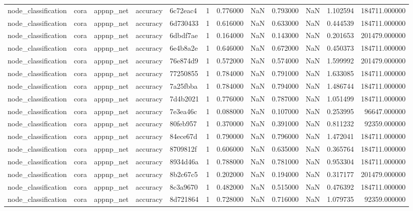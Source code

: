 \begin{tabular}{lllllrrrrrrr}
node_classification & cora & appnp_net & accuracy & 6c72eac4 & 1 & 0.776000 & NaN & 0.793000 & NaN & 1.102594 & 184711.000000 \\
node_classification & cora & appnp_net & accuracy & 6d730433 & 1 & 0.616000 & NaN & 0.633000 & NaN & 0.444539 & 184711.000000 \\
node_classification & cora & appnp_net & accuracy & 6dbdf7ae & 1 & 0.164000 & NaN & 0.143000 & NaN & 0.201653 & 201479.000000 \\
node_classification & cora & appnp_net & accuracy & 6e4b8a2e & 1 & 0.646000 & NaN & 0.672000 & NaN & 0.450373 & 184711.000000 \\
node_classification & cora & appnp_net & accuracy & 76e874d9 & 1 & 0.572000 & NaN & 0.574000 & NaN & 1.599992 & 201479.000000 \\
node_classification & cora & appnp_net & accuracy & 77250855 & 1 & 0.784000 & NaN & 0.791000 & NaN & 1.633085 & 184711.000000 \\
node_classification & cora & appnp_net & accuracy & 7a25fbba & 1 & 0.784000 & NaN & 0.794000 & NaN & 1.486744 & 184711.000000 \\
node_classification & cora & appnp_net & accuracy & 7d4b2021 & 1 & 0.776000 & NaN & 0.787000 & NaN & 1.051499 & 184711.000000 \\
node_classification & cora & appnp_net & accuracy & 7e3ea46c & 1 & 0.088000 & NaN & 0.107000 & NaN & 0.253995 & 96647.000000 \\
node_classification & cora & appnp_net & accuracy & 80feb957 & 1 & 0.370000 & NaN & 0.391000 & NaN & 0.811232 & 92359.000000 \\
node_classification & cora & appnp_net & accuracy & 84ece67d & 1 & 0.790000 & NaN & 0.796000 & NaN & 1.472041 & 184711.000000 \\
node_classification & cora & appnp_net & accuracy & 8709812f & 1 & 0.606000 & NaN & 0.635000 & NaN & 0.365764 & 184711.000000 \\
node_classification & cora & appnp_net & accuracy & 8934d46a & 1 & 0.788000 & NaN & 0.781000 & NaN & 0.953304 & 184711.000000 \\
node_classification & cora & appnp_net & accuracy & 8b2c67c5 & 1 & 0.202000 & NaN & 0.194000 & NaN & 0.317177 & 201479.000000 \\
node_classification & cora & appnp_net & accuracy & 8c3a9670 & 1 & 0.482000 & NaN & 0.515000 & NaN & 0.476392 & 184711.000000 \\
node_classification & cora & appnp_net & accuracy & 8d721864 & 1 & 0.728000 & NaN & 0.716000 & NaN & 1.079735 & 92359.000000 \\

\end{tabular}
